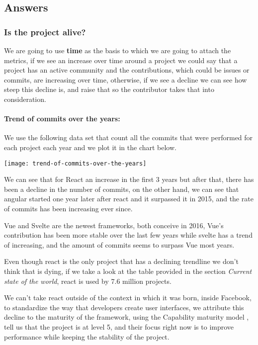 \subsection{Answers}
\subsubsection{Is the project alive?}
We are going to use \textbf{time} as the basis to which we are going to attach the metrics, if we see an increase over time around a project we could say that a project has an active community and the contributions, which could be issues or commits, are increasing over time, otherwise, if we see a decline we can see how steep this decline is, and raise that so the contributor takes that into consideration.

\paragraph{Trend of commits over the years:} 

We use the following data set \cite{trend-of-commits-over-the-years} that count all the commits that were performed for each project each year and we plot it in the chart below.
\begin{center}
    \texttt{[image: trend-of-commits-over-the-years]}    
\end{center}

We can see that for React an increase in the first 3 years but after that, there has been a decline in the number of commits, on the other hand, we can see that angular started one year later after react and it surpassed it in 2015, and the rate of commits has been increasing ever since.

Vue and Svelte are the newest frameworks, both conceive in 2016, Vue's contribution has been more stable over the last few years while svelte has a trend of increasing, and the amount of commits seems to surpass Vue most years.

Even though react is the only project that has a declining trendline we don't think that is dying, if we take a look at the table provided in the section \textit{Current state of the world}, react is used by 7.6 million projects.

We can't take react outside of the context in which it was born, inside Facebook, to standardize the way that developers create user interfaces, we attribute this decline to the maturity of the framework, using the Capability maturity model \cite{cmm}, tell us that the project is at level 5, and their focus right now is to improve performance while keeping the stability of the project.

